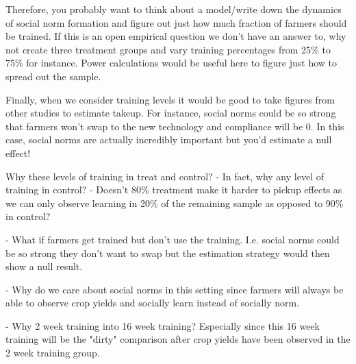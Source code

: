 \documentclass{article}
\begin{document}
Therefore, you probably want to think about a model/write down the dynamics of
social norm formation and figure out just how much fraction of farmers should 
be trained. If this is an open empirical question we don't have an answer to, 
why not create three treatment groups and vary training percentages from 25\% to 
75\% for instance. Power calculations would be useful here to figure just how 
to spread out the sample.



Finally, when we consider training levels it would be good to take figures from 
other studies to estimate takeup. For instance, social norms could be so strong 
that farmers won't swap to the new technology and compliance will be 0. In this 
case, social norms are actually incredibly important but you'd estimate a null 
effect!

Why these levels of training in treat and control? 
- In fact, why any level of training in control?
- Doesn't 80\% treatment make it harder to pickup effects as we can only 
observe learning in 20\% of the remaining sample as opposed to 90\% in control?



- What if farmers get trained but don't use the training. I.e. social norms 
could be so strong they don't want to swap but the estimation strategy would then 
show a null result.

- Why do we care about social norms in this setting since farmers will always be 
able to observe crop yields and socially learn instead of socially norm. 





- Why 2 week training into 16 week training? Especially since this 16 week 
training will be the "dirty" comparison after crop yields have been observed in 
the 2 week training group.
    
\end{document}
